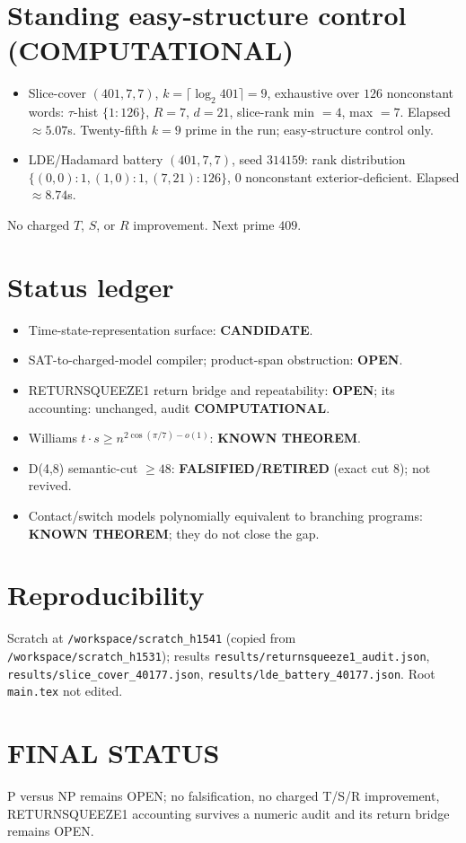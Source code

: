 \documentclass[11pt]{article}
\begin{document}
\section*{Standing easy-structure control (COMPUTATIONAL)}
\begin{itemize}
\item Slice-cover $(401,7,7)$, $k=\lceil\log_2 401\rceil=9$, exhaustive over $126$ nonconstant words:
$\tau$-hist $\{1{:}126\}$, $R=7$, $d=21$, slice-rank min $=4$, max $=7$. Elapsed $\approx5.07$s.
Twenty-fifth $k{=}9$ prime in the run; easy-structure control only.
\item LDE/Hadamard battery $(401,7,7)$, seed $314159$: rank distribution
$\{(0,0){:}1,(1,0){:}1,(7,21){:}126\}$, $0$ nonconstant exterior-deficient. Elapsed $\approx8.74$s.
\end{itemize}
No charged $T$, $S$, or $R$ improvement. Next prime $409$.

\section*{Status ledger}
\begin{itemize}
\item Time-state-representation surface: \textbf{CANDIDATE}.
\item SAT-to-charged-model compiler; product-span obstruction: \textbf{OPEN}.
\item RETURNSQUEEZE1 return bridge and repeatability: \textbf{OPEN}; its accounting: unchanged, audit
\textbf{COMPUTATIONAL}.
\item Williams $t\cdot s\ge n^{2\cos(\pi/7)-o(1)}$: \textbf{KNOWN THEOREM}.
\item D(4,8) semantic-cut $\ge48$: \textbf{FALSIFIED/RETIRED} (exact cut 8); not revived.
\item Contact/switch models polynomially equivalent to branching programs: \textbf{KNOWN THEOREM}; they do not close the gap.
\end{itemize}

\section*{Reproducibility}
Scratch at \texttt{/workspace/scratch\_h1541} (copied from \texttt{/workspace/scratch\_h1531});
results \texttt{results/returnsqueeze1\_audit.json}, \texttt{results/slice\_cover\_40177.json},
\texttt{results/lde\_battery\_40177.json}. Root \texttt{main.tex} not edited.

\section*{FINAL STATUS}
P versus NP remains OPEN; no falsification, no charged T/S/R improvement, RETURNSQUEEZE1 accounting
survives a numeric audit and its return bridge remains OPEN.
\end{document}
